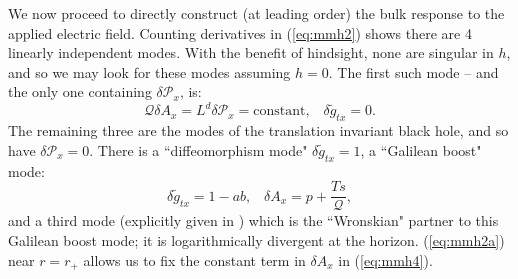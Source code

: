 \documentclass[10pt, oneside]{book}
\begin{document}
\begin{doublespace}
We now proceed to directly construct (at leading order) the bulk response to the applied electric field.  Counting derivatives in (\ref{eq:mmh2}) shows there are 4 linearly independent modes.   With the benefit of hindsight, none are singular in $h$, and so we may look for these modes assuming $h=0$.  The first such mode -- and the only one containing $\delta\mathcal{P}_x$, is: \begin{equation}
\mathcal{Q}\delta A_x = L^d \delta\mathcal{P}_x = \text{constant}, \;\;\; \delta\tilde{g}_{tx} = 0.   \label{eq:mmh3}
\end{equation}
The remaining three are the modes of the translation invariant black hole, and so have $\delta \mathcal{P}_x =0$.   There is a ``diffeomorphism mode" $\delta\tilde{g}_{tx} = 1$,  a ``Galilean boost" mode: \begin{equation}
\delta\tilde{g}_{tx}=1-ab,\;\;\; \delta A_x = p + \frac{Ts}{\mathcal{Q}},   \label{eq:mmh4}
\end{equation}
and a third mode (explicitly given in \cite{Lucas:2015vna}) which is the ``Wronskian" partner to this Galilean boost mode; it is logarithmically divergent at the horizon.   (\ref{eq:mmh2a}) near $r=r_+$ allows us to fix the constant term in $\delta A_x$ in (\ref{eq:mmh4}).


\end{doublespace}
\end{document}
